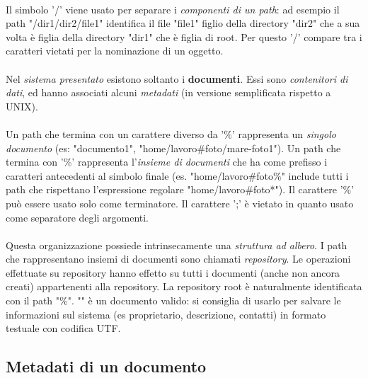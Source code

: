 \documentclass[11pt,a4paper,english]{article}
\begin{document}
\paragraph{} Il simbolo '/' viene usato per separare i \emph{componenti di un path}: ad esempio il path "/dir1/dir2/file1" identifica il file "file1" figlio della directory "dir2" che a sua volta è figlia della directory "dir1" che è figlia di root. Per questo '/' compare tra i caratteri vietati per la nominazione di un oggetto.  

\paragraph{} Nel \emph{sistema presentato} esistono soltanto i \textbf{documenti}. Essi sono \emph{contenitori di dati}, ed hanno associati alcuni \emph{metadati} (in versione semplificata rispetto a UNIX). 

\paragraph{} Un path che termina con un carattere diverso da '\%' rappresenta un \emph{singolo documento} (es: "documento1", "home/lavoro\#foto/mare-foto1"). Un path che termina con '\%' rappresenta l'\emph{insieme di documenti} che ha come prefisso i caratteri antecedenti al simbolo finale (es. "home/lavoro\#foto\%" include tutti i path che rispettano l'espressione regolare "home/lavoro\#foto*"). Il carattere '\%' può essere usato solo come terminatore. Il carattere ';' è vietato in quanto usato come separatore degli argomenti. 

\paragraph{} Questa organizzazione possiede intrinsecamente una \emph{struttura ad albero}. I path che rappresentano insiemi di documenti sono chiamati \emph{repository}. Le operazioni effettuate su repository hanno effetto su tutti i documenti (anche non ancora creati) appartenenti alla repository. La repository root è naturalmente identificata con il path "\%". "" è un documento valido: si consiglia di usarlo per salvare le informazioni sul sistema (es proprietario, descrizione, contatti) in formato testuale con codifica UTF. 

\subsection{Metadati di un documento}
\end{document}
